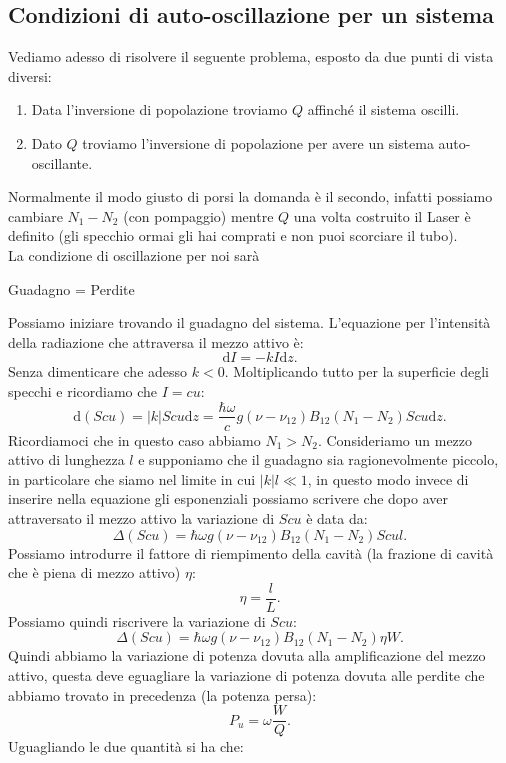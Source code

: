 \subsection{Condizioni di auto-oscillazione per un sistema}%
Vediamo adesso di risolvere il seguente problema, esposto da due punti di vista diversi:
\begin{enumerate}
    \item Data l'inversione di popolazione troviamo $Q$ affinché il sistema oscilli.
    \item Dato $Q$ troviamo l'inversione di popolazione per avere un sistema auto-oscillante.	
\end{enumerate}
Normalmente il modo giusto di porsi la domanda è il secondo, infatti possiamo cambiare $N_1-N_2$ (con pompaggio) mentre $Q$ una volta costruito il Laser è definito (gli specchio ormai gli hai comprati e non puoi scorciare il tubo).\\
La condizione di oscillazione per noi sarà 
\begin{center}
    Guadagno = Perdite
\end{center}
Possiamo iniziare trovando il guadagno del sistema. L'equazione per l'intensità della radiazione che attraversa il mezzo attivo è:
\[
\text{d}I= -kI\text{d}z
.\] 
Senza dimenticare che adesso $k<0$. Moltiplicando tutto per la superficie degli specchi e ricordiamo che $I=cu$:
\[
    \text{d}\left(Scu\right)=\left|k\right|Scu\text{d}z=
    \frac{\hbar \omega}{c}g(\nu-\nu_{12})B_{12}\left(N_1-N_2\right)Scu\text{d}z
.\] 
Ricordiamoci che in questo caso abbiamo $N_1>N_2$. Consideriamo un mezzo attivo di lunghezza $l$ e supponiamo che il guadagno sia ragionevolmente piccolo, in particolare che siamo nel limite in cui $\left|k\right|l\ll 1$, in questo modo invece di inserire nella equazione gli esponenziali possiamo scrivere che dopo aver attraversato il mezzo attivo la variazione di $Scu$ è data da:
\[
    \Delta\left(Scu\right)= \hbar \omega g(\nu-\nu_{12}) B_{12}
    \left(N_1-N_2\right)Scul
.\] 
Possiamo introdurre il fattore di riempimento della cavità (la frazione di cavità che è piena di mezzo attivo) $\eta$:
\[
\eta = \frac{l}{L} 
.\] 
Possiamo quindi riscrivere la variazione di $Scu$:
\[
    \Delta (Scu) = \hbar \omega g(\nu-\nu_{12}) B_{12}\left(N_1-N_2\right)
    \eta W
.\] 
Quindi abbiamo la variazione di potenza dovuta alla amplificazione del mezzo attivo, questa deve eguagliare la variazione di potenza dovuta alle perdite che abbiamo trovato in precedenza (la potenza persa):
\[
P_u = \omega\frac{W}{Q}
.\] 
Uguagliando le due quantità si ha che:
